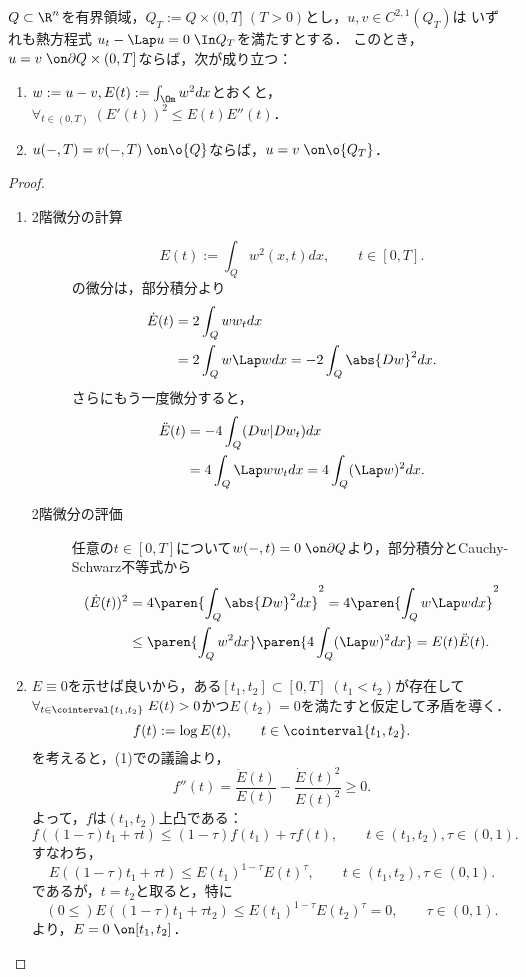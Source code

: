 \documentclass[uplatex,dvipdfmx]{jsarticle}
\begin{document}
\begin{problem}[時間後方一意性]
    $Q\subset\R^n$を有界領域，$Q_T:=Q\times{(0,T]}\;(T>0)$とし，$u,v\in C^{2,1}(Q_T)$は
    いずれも熱方程式
    $u_t-\Lap u=0\;\In Q_T$を満たすとする．
    このとき，$u=v\;\on\partial Q\times(0,T]$ならば，次が成り立つ：
    \begin{enumerate}
        \item $w:=u-v,E(t):=\int_\Om w^2dx$とおくと，$\forall_{t\in(0,T)}\;(E'(t))^2\le E(t)E''(t)$．
        \item $u(-,T)=v(-,T)\;\on\o{Q}$ならば，$u=v\;\on\o{Q_T}$．
    \end{enumerate}
\end{problem}
\begin{proof}\mbox{}
    \begin{enumerate}
        \item 
        \begin{description}
            \item[2階微分の計算] \[E(t):=\int_Qw^2(x,t)dx,\qquad t\in[0,T].\]
            の微分は，部分積分より
            \begin{align*}
                \dot{E}(t)&=2\int_Qww_tdx\\
                &=2\int_Qw\Lap wdx=-2\int_Q\abs{Dw}^2dx.
            \end{align*}
            さらにもう一度微分すると，
            \begin{align*}
                \ddot{E}(t)&=-4\int_Q(Dw|Dw_t)dx\\
                &=4\int_Q\Lap ww_tdx=4\int_Q(\Lap w)^2dx.
            \end{align*}
            \item[2階微分の評価] 任意の$t\in[0,T]$について$w(-,t)=0\;\on\partial Q$より，部分積分とCauchy-Schwarz不等式から
            \begin{align*}
                (\dot{E}(t))^2&=4\paren{\int_Q\abs{Dw}^2dx}^2=4\paren{\int_Qw\Lap wdx}^2\\
                &\le\paren{\int_Qw^2dx}\paren{4\int_Q(\Lap w)^2dx}=E(t)\ddot{E}(t).
            \end{align*}
        \end{description}
        \item $E\equiv0$を示せば良いから，ある$[t_1,t_2]\subset[0,T]\;(t_1<t_2)$が存在して$\forall_{t\in\cointerval{t_1,t_2}}\;E(t)>0$かつ$E(t_2)=0$を満たすと仮定して矛盾を導く．
        \[f(t):=\log E(t),\qquad t\in\cointerval{t_1,t_2}.\]
        を考えると，(1)での議論より，
        \[f''(t)=\frac{\ddot{E}(t)}{E(t)}-\frac{\dot{E}(t)^2}{E(t)^2}\ge0.\]
        よって，$f$は$(t_1,t_2)$上凸である：
        \[f((1-\tau)t_1+\tau t)\le(1-\tau)f(t_1)+\tau f(t),\qquad t\in(t_1,t_2),\tau\in(0,1).\]
        すなわち，
        \[E((1-\tau)t_1+\tau t)\le E(t_1)^{1-\tau}E(t)^{\tau},\qquad t\in(t_1,t_2),\tau\in(0,1).\]
        であるが，$t=t_2$と取ると，特に
        \[(0\le)E((1-\tau)t_1+\tau t_2)\le E(t_1)^{1-\tau}E(t_2)^\tau=0,\qquad\tau\in(0,1).\]
        より，$E=0\;\on[t_1,t_2]$．
    \end{enumerate}
\end{proof}
\end{document}
